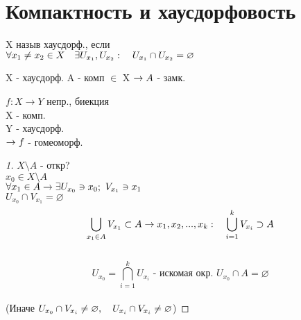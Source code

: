\documentclass[geometry.tex]{subfiles}
\begin{document}
  \section{Компактность и хаусдорфовость}

  \begin{definition}
      X назыв хаусдорф., если\\
      $\forall x_1 \neq x_2 \in X \quad \exists U_{x_1}, U_{x_2}: \quad U_{x_1} \cap U_{x_2} = \varnothing$
  \end{definition}

  \begin{theorem}[1]
      X - хаусдорф. A - комп $\in$ X $\rightarrow A$ - замк.
  \end{theorem}

  \begin{theorem}
      $f: X \rightarrow Y$ непр., биекция\\
      X - комп.\\
      Y - хаусдорф.\\
      $\rightarrow f$ - гомеоморф.
  \end{theorem}

  \begin{proof} [1]
      $X \setminus A$ - откр?\\
      $x_0 \in X \setminus A$\\
      $\forall x_1 \in A \rightarrow \exists U_{x_0} \ni x_0; \ V_{x_1} \ni x_1$\\
      $U_{x_0} \cap V_{x_1} = \varnothing$\\
      \[\bigcup_{x_1 \in A} V_{x_1} \subset A \rightarrow x_1, x_2, ..., x_k:
      \quad \bigcup_{i = 1}^k V_{x_i} \supset A\]\\
      \[U_{x_0} = \bigcap_{i = 1}^k U_{x_i} \text{ - искомая окр.  } U_{x_0} \cap A = \varnothing\]\\
      (Иначе $U_{x_0} \cap V_{x_i} \neq \varnothing, \quad U_{x_i} \cap V_{x_i} \neq \varnothing$)
  \end{proof}
\end{document}
